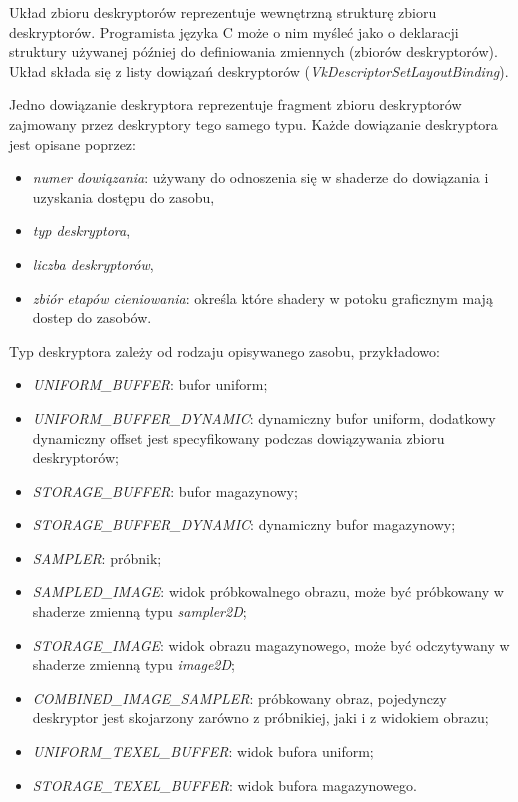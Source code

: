 Układ zbioru deskryptorów reprezentuje wewnętrzną strukturę zbioru deskryptorów. Programista języka C może o nim myśleć jako o deklaracji struktury używanej później do definiowania zmiennych (zbiorów deskryptorów).
Układ składa się z listy dowiązań deskryptorów (\textit{VkDescriptorSetLayoutBinding}).

Jedno dowiązanie deskryptora reprezentuje fragment zbioru deskryptorów zajmowany przez deskryptory tego samego typu.
Każde dowiązanie deskryptora jest opisane poprzez:
\begin{itemize}
	\item {\textit{numer dowiązania}}: używany do odnoszenia się w shaderze do dowiązania i uzyskania dostępu do
	zasobu,
	\item \textit{typ deskryptora},
	\item \textit{liczba deskryptorów},
	\item {\textit{zbiór etapów cieniowania}}: określa które shadery w potoku graficznym mają dostep do zasobów.
\end{itemize}
Typ deskryptora zależy od rodzaju opisywanego zasobu, przykładowo:
\begin{itemize}
	\item {\textit{UNIFORM\_BUFFER}}: bufor uniform;
	\item {\textit{UNIFORM\_BUFFER\_DYNAMIC}}: dynamiczny bufor uniform, dodatkowy dynamiczny offset jest specyfikowany podczas dowiązywania zbioru deskryptorów;
	\item {\textit{STORAGE\_BUFFER}}: bufor magazynowy;
	\item {\textit{STORAGE\_BUFFER\_DYNAMIC}}: dynamiczny bufor magazynowy;
	\item {\textit{SAMPLER}}: próbnik;
	\item {\textit{SAMPLED\_IMAGE}}: widok próbkowalnego obrazu, może być próbkowany w shaderze zmienną typu \textit{sampler2D};
	\item {\textit{STORAGE\_IMAGE}}: widok obrazu magazynowego, może być odczytywany w shaderze zmienną typu \textit{image2D};
	\item {\textit{COMBINED\_IMAGE\_SAMPLER}}: próbkowany obraz, pojedynczy deskryptor jest skojarzony zarówno z próbnikiej, jaki i z widokiem obrazu;
	\item {\textit{UNIFORM\_TEXEL\_BUFFER}}: widok bufora uniform;
	\item {\textit{STORAGE\_TEXEL\_BUFFER}}: widok bufora magazynowego.
\end{itemize}

